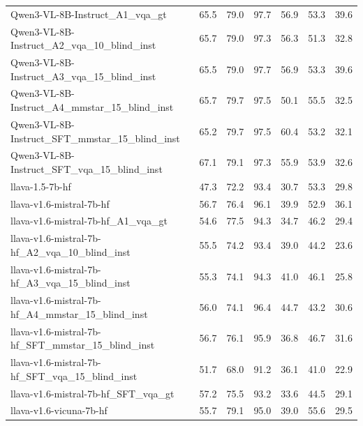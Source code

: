 \begin{tabular}{lrrrrrr}
Qwen3-VL-8B-Instruct_A1_vqa_gt & 65.5 & 79.0 & 97.7 & 56.9 & 53.3 & 39.6 \\
Qwen3-VL-8B-Instruct_A2_vqa_10_blind_inst & 65.7 & 79.0 & 97.3 & 56.3 & 51.3 & 32.8 \\
Qwen3-VL-8B-Instruct_A3_vqa_15_blind_inst & 65.5 & 79.0 & 97.7 & 56.9 & 53.3 & 39.6 \\
Qwen3-VL-8B-Instruct_A4_mmstar_15_blind_inst & 65.7 & 79.7 & 97.5 & 50.1 & 55.5 & 32.5 \\
Qwen3-VL-8B-Instruct_SFT_mmstar_15_blind_inst & 65.2 & 79.7 & 97.5 & 60.4 & 53.2 & 32.1 \\
Qwen3-VL-8B-Instruct_SFT_vqa_15_blind_inst & 67.1 & 79.1 & 97.3 & 55.9 & 53.9 & 32.6 \\
llava-1.5-7b-hf & 47.3 & 72.2 & 93.4 & 30.7 & 53.3 & 29.8 \\
llava-v1.6-mistral-7b-hf & 56.7 & 76.4 & 96.1 & 39.9 & 52.9 & 36.1 \\
llava-v1.6-mistral-7b-hf_A1_vqa_gt & 54.6 & 77.5 & 94.3 & 34.7 & 46.2 & 29.4 \\
llava-v1.6-mistral-7b-hf_A2_vqa_10_blind_inst & 55.5 & 74.2 & 93.4 & 39.0 & 44.2 & 23.6 \\
llava-v1.6-mistral-7b-hf_A3_vqa_15_blind_inst & 55.3 & 74.1 & 94.3 & 41.0 & 46.1 & 25.8 \\
llava-v1.6-mistral-7b-hf_A4_mmstar_15_blind_inst & 56.0 & 74.1 & 96.4 & 44.7 & 43.2 & 30.6 \\
llava-v1.6-mistral-7b-hf_SFT_mmstar_15_blind_inst & 56.7 & 76.1 & 95.9 & 36.8 & 46.7 & 31.6 \\
llava-v1.6-mistral-7b-hf_SFT_vqa_15_blind_inst & 51.7 & 68.0 & 91.2 & 36.1 & 41.0 & 22.9 \\
llava-v1.6-mistral-7b-hf_SFT_vqa_gt & 57.2 & 75.5 & 93.2 & 33.6 & 44.5 & 29.1 \\
llava-v1.6-vicuna-7b-hf & 55.7 & 79.1 & 95.0 & 39.0 & 55.6 & 29.5 \\
\bottomrule
\end{tabular}
